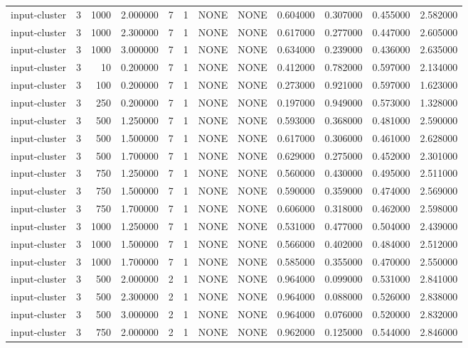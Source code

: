\begin{tabular}{lrrrllllrrrr}
input-cluster & 3 & 1000 & 2.000000 & 7 & 1 & NONE & NONE & 0.604000 & 0.307000 & 0.455000 & 2.582000 \\
input-cluster & 3 & 1000 & 2.300000 & 7 & 1 & NONE & NONE & 0.617000 & 0.277000 & 0.447000 & 2.605000 \\
input-cluster & 3 & 1000 & 3.000000 & 7 & 1 & NONE & NONE & 0.634000 & 0.239000 & 0.436000 & 2.635000 \\
input-cluster & 3 & 10 & 0.200000 & 7 & 1 & NONE & NONE & 0.412000 & 0.782000 & 0.597000 & 2.134000 \\
input-cluster & 3 & 100 & 0.200000 & 7 & 1 & NONE & NONE & 0.273000 & 0.921000 & 0.597000 & 1.623000 \\
input-cluster & 3 & 250 & 0.200000 & 7 & 1 & NONE & NONE & 0.197000 & 0.949000 & 0.573000 & 1.328000 \\
input-cluster & 3 & 500 & 1.250000 & 7 & 1 & NONE & NONE & 0.593000 & 0.368000 & 0.481000 & 2.590000 \\
input-cluster & 3 & 500 & 1.500000 & 7 & 1 & NONE & NONE & 0.617000 & 0.306000 & 0.461000 & 2.628000 \\
input-cluster & 3 & 500 & 1.700000 & 7 & 1 & NONE & NONE & 0.629000 & 0.275000 & 0.452000 & 2.301000 \\
input-cluster & 3 & 750 & 1.250000 & 7 & 1 & NONE & NONE & 0.560000 & 0.430000 & 0.495000 & 2.511000 \\
input-cluster & 3 & 750 & 1.500000 & 7 & 1 & NONE & NONE & 0.590000 & 0.359000 & 0.474000 & 2.569000 \\
input-cluster & 3 & 750 & 1.700000 & 7 & 1 & NONE & NONE & 0.606000 & 0.318000 & 0.462000 & 2.598000 \\
input-cluster & 3 & 1000 & 1.250000 & 7 & 1 & NONE & NONE & 0.531000 & 0.477000 & 0.504000 & 2.439000 \\
input-cluster & 3 & 1000 & 1.500000 & 7 & 1 & NONE & NONE & 0.566000 & 0.402000 & 0.484000 & 2.512000 \\
input-cluster & 3 & 1000 & 1.700000 & 7 & 1 & NONE & NONE & 0.585000 & 0.355000 & 0.470000 & 2.550000 \\
input-cluster & 3 & 500 & 2.000000 & 2 & 1 & NONE & NONE & 0.964000 & 0.099000 & 0.531000 & 2.841000 \\
input-cluster & 3 & 500 & 2.300000 & 2 & 1 & NONE & NONE & 0.964000 & 0.088000 & 0.526000 & 2.838000 \\
input-cluster & 3 & 500 & 3.000000 & 2 & 1 & NONE & NONE & 0.964000 & 0.076000 & 0.520000 & 2.832000 \\
input-cluster & 3 & 750 & 2.000000 & 2 & 1 & NONE & NONE & 0.962000 & 0.125000 & 0.544000 & 2.846000 \\

\end{tabular}
